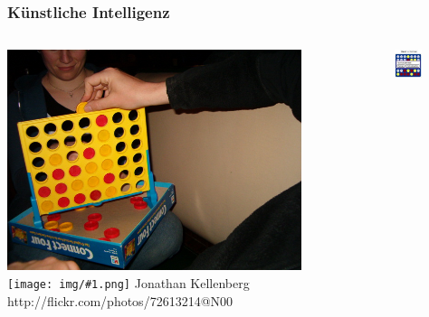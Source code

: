 \documentclass[12pt]{beamer}
\newcommand{\cc}[1]{\texttt{[image: img/\#1.png]}\hspace{1mm}}
\begin{document}
\begin{frame}
  \frametitle{Künstliche Intelligenz}
   {
    \begin{columns}
      \begin{column}{0.5 \textwidth}
        \begin{center}
          \includegraphics[width=0.8\textwidth]{img/connect_four.jpg} \\
          \tiny \cc{by} Jonathan Kellenberg \\ http://flickr.com/photos/72613214@N00
        \end{center}
      \end{column}
      \begin{column}{0.5 \textwidth}
        \begin{center}
          \includegraphics[width=0.4\textwidth]{img/4_gewinnt.jpg} \\
        \end{center}
      \end{column}
    \end{columns}
  }
   {
    \begin{columns}
      \begin{column}{0.5 \textwidth}
        \begin{center}

\end{center}
\end{column}
\end{columns}}
\end{frame}
\end{document}
